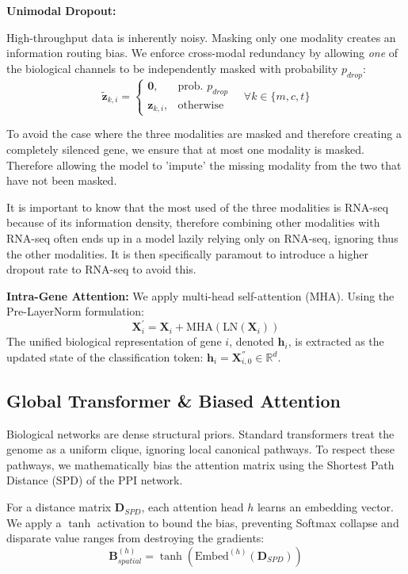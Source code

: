 \documentclass[10pt, twocolumn]{article}
\begin{document}
\noindent
\textbf{Unimodal Dropout:} 

High-throughput data is inherently noisy. Masking only one modality creates an information routing bias. We enforce cross-modal redundancy by allowing \textit{one} of the biological channels to be independently masked with probability $p_{drop}$:
\begin{equation}
    \tilde{\mathbf{z}}_{k,i} = \begin{cases} 
      \mathbf{0}, & \text{prob. } p_{drop} \\
      \mathbf{z}_{k,i}, & \text{otherwise}
   \end{cases} \quad \forall k \in \{m, c, t\}
\end{equation}

To avoid the case where the three modalities are masked and therefore creating a completely silenced gene, we ensure that at most one modality is masked. Therefore allowing the model to 'impute' the missing modality from the two that have not been masked. 


It is important to know that the most used of the three modalities is RNA-seq because of its information density, therefore combining other modalities with RNA-seq often ends up in a model lazily relying only on RNA-seq, ignoring thus the other modalities. It is then specifically paramout to introduce a higher dropout rate to RNA-seq to avoid this.\vspace{0.3cm}

\noindent
\textbf{Intra-Gene Attention:} We apply multi-head self-attention (MHA). Using the Pre-LayerNorm formulation:
\begin{equation}
    \mathbf{X}_i^{'} = \mathbf{X}_i + \text{MHA}(\text{LN}(\mathbf{X}_i))
\end{equation}
The unified biological representation of gene $i$, denoted $\mathbf{h}_i$, is extracted as the updated state of the classification token: $\mathbf{h}_i = \mathbf{X}_{i,0}^{''} \in \mathbb{R}^d$.

\subsection{Global Transformer \& Biased Attention}
Biological networks are dense structural priors. Standard transformers treat the genome as a uniform clique, ignoring local canonical pathways. To respect these pathways, we mathematically bias the attention matrix using the Shortest Path Distance (SPD) of the PPI network.

For a distance matrix $\mathbf{D}_{SPD}$, each attention head $h$ learns an embedding vector. We apply a $\tanh$ activation to bound the bias, preventing Softmax collapse and disparate value ranges from destroying the gradients:
\begin{equation}
    \mathbf{B}_{spatial}^{(h)} = \tanh\left(\text{Embed}^{(h)}(\mathbf{D}_{SPD})\right)
\end{equation}
\end{document}
